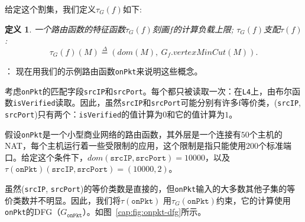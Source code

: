 \documentclass{ctexart}
\newcommand{\para}[1]{\smallskip\noindent {\bf #1}}
\newtheorem{definition}{定义}
\begin{document}
给定这个割集，我们定义$\tau_G(f)$如下:



\begin{definition} 一个路由函数的特征函数$\tau_G(f)$刻画$f$的计算负载上限; $\tau_G(f)$支配$\tau(f)$:
\begin{equation*}
\tau_G(f)(M) \overset{\Delta}{=} (dom(M),\ G_f.vertexMinCut(M)).
\end{equation*}
\end{definition}

\para{示例}： 现在用我们的示例路由函数\texttt{onPkt}来说明这些概念。

考虑\texttt{onPkt}的匹配字段\texttt{srcIP}和\texttt{srcPort}。每个都只被读取一次：在\texttt{L4}上，由布尔函数\texttt{isVerified}读取。因此，虽然\texttt{srcIP}和\texttt{srcPort}可能分别有许多f等价类，(\texttt{srcIP}, \texttt{srcPort})只有两个：\texttt{isVerified}的值计算为$0$和它的值计算为$1$。

假设\texttt{onPkt}是一个小型商业网络的路由函数，其外层是一个连接有$50$个主机的NAT，每个主机运行着一些受限制的应用，这个限制是指只能使用$200$个标准端口。给定这个条件下，$dom(\texttt{srcIP}, \texttt{srcPort}) = 10000$，以及$\tau(\texttt{onPkt})(\texttt{srcIP}, \texttt{srcPort}) = (10000, 2)$。

虽然(\texttt{srcIP}, \texttt{srcPort})的等价类数是直接的，但\texttt{onPkt}输入的大多数其他子集的等价类数并不明显。因此，我们将$\tau(\texttt{onPkt})$ 用$\tau_G(\texttt{onPkt})$约束，它的计算使用\texttt{onPkt}的DFG（$G_{\texttt{onPkt}}$）。如图~\ref{cap:fig:onpkt-dfg}所示。


\end{document}
